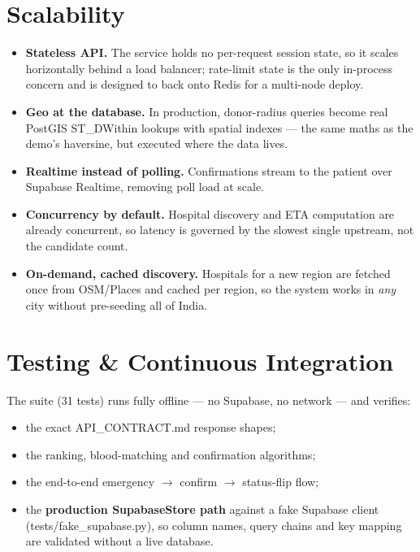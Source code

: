\documentclass[11pt]{article}
\newcommand{\code}[1]{\colorbox{ghCodeBg}{\ttfamily\small #1}}
\begin{document}
\section{Scalability}

\begin{itemize}
  \item \textbf{Stateless API.} The service holds no per-request session state, so it
  scales horizontally behind a load balancer; rate-limit state is the only in-process
  concern and is designed to back onto Redis for a multi-node deploy.
  \item \textbf{Geo at the database.} In production, donor-radius queries become real
  PostGIS \code{ST\_DWithin} lookups with spatial indexes --- the same maths as the
  demo's haversine, but executed where the data lives.
  \item \textbf{Realtime instead of polling.} Confirmations stream to the patient over
  Supabase Realtime, removing poll load at scale.
  \item \textbf{Concurrency by default.} Hospital discovery and ETA computation are
  already concurrent, so latency is governed by the slowest single upstream, not the
  candidate count.
  \item \textbf{On-demand, cached discovery.} Hospitals for a new region are fetched
  once from OSM/Places and cached per region, so the system works in \emph{any} city
  without pre-seeding all of India.
\end{itemize}

\section{Testing \& Continuous Integration}

The suite (31 tests) runs fully offline --- no Supabase, no network --- and verifies:

\begin{itemize}
  \item the exact \code{API\_CONTRACT.md} response shapes;
  \item the ranking, blood-matching and confirmation algorithms;
  \item the end-to-end emergency $\rightarrow$ confirm $\rightarrow$ status-flip flow;
  \item the \textbf{production \code{SupabaseStore} path} against a fake Supabase client
  (\code{tests/fake\_supabase.py}), so column names, query chains and key mapping are
  validated without a live database.
\end{itemize}
\end{document}
